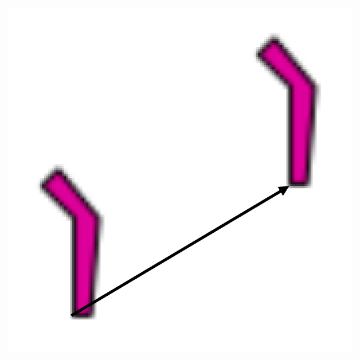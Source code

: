 \documentclass[12pt]{report}
\begin{document}
\begin{figure}[H]

  \begin{subfigure}[b]{0.22\textwidth}
    \includegraphics[width=.9\textwidth]{crtez_translacija.png}
    \label{fig:f4}


\end{subfigure}
\end{figure}
\end{document}
